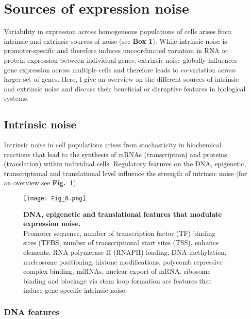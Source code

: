 
\section{Sources of expression noise} 

Variability in expression across homogeneous populations of cells arises from intrinsic and extrinsic sources of noise (see \textbf{Box 1}). While intrinsic noise is promoter-specific and therefore induces uncoordinated variation in RNA or protein expression between individual genes, extrinsic noise globally influences gene expression across multiple cells and therefore leads to co-variation across larger set of genes. Here, I give an overview on the different sources of intrinsic and extrinsic noise and discuss their beneficial or disruptive features in biological systems.

\subsection{Intrinsic noise}

Intrinsic noise in cell populations arises from stochasticity in biochemical reactions that lead to the synthesis of mRNAs (transcription) and proteins (translation) within individual cells. Regulatory features on the DNA, epigenetic, transcriptional and translational level influence the strength of intrinsic noise (for an overview see \textbf{Fig.~\ref{fig0:overview_intrinsic}}).

\begin{figure}[!h]
\centering
\texttt{[image: Fig\_6.png]}
\caption[DNA, epigenetic and translational features that modulate expression noise]{\textbf{DNA, epigenetic and translational features that modulate expression noise.}\\
Promoter sequence, number of transcription factor (TF) binding sites (TFBS, number of transcriptional start sites (TSS), enhance elements, RNA polymerase II (RNAPII) loading, DNA methylation, nucleosome positioning, histone modifications, polycomb repressive complex binding, miRNAs, nuclear export of mRNA, ribosome binding and blockage via stem loop formation are features that induce gene-specific intrinsic noise.}
\label{fig0:overview_intrinsic}
\end{figure}

\subsubsection{DNA features}

